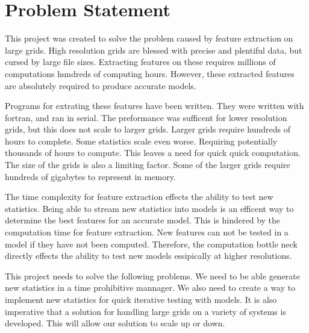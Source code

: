 \section{Problem Statement}
This project was created to solve the problem caused by feature extraction on large grids.
High resolution grids are blessed with precise and plentiful data, but cursed by large file sizes.
Extracting features on these requires millions of computations hundreds of computing hours.
However, these extracted features are absolutely required to produce accurate models.


\par
Programs for extrating these features have been written. 
They were written with fortran, and ran in serial.
The preformance was sufficent for lower resolution grids, but this does not scale to larger grids.
Larger grids require hundreds of hours to complete.
Some statistics scale even worse.
Requiring potentially thousands of hours to compute. 
This leaves a need for quick quick computation.
The size of the grids is also a limiting factor. 
Some of the larger grids require hundreds of gigabytes to represent in memory.

\par
The time complexity for feature extraction effects the ability to test new statistics.
Being able to stream new statistics into models is an efficent way to determine the best features for an accurate model.
This is hindered by the computation time for feature extraction.
New features can not be tested in a model if they have not been computed.
Therefore, the computation bottle neck directly effects the ability to test new models essipically at higher resolutions.

\par
This project needs to solve the following problems.
We need to be able generate new statistics in a time prohibitive mannager.
We also need to create a way to implement new statistics for quick iterative testing with models.
It is also imperative that a solution for handling large grids on a variety of systems is developed.
This will allow our solution to scale up or down.

